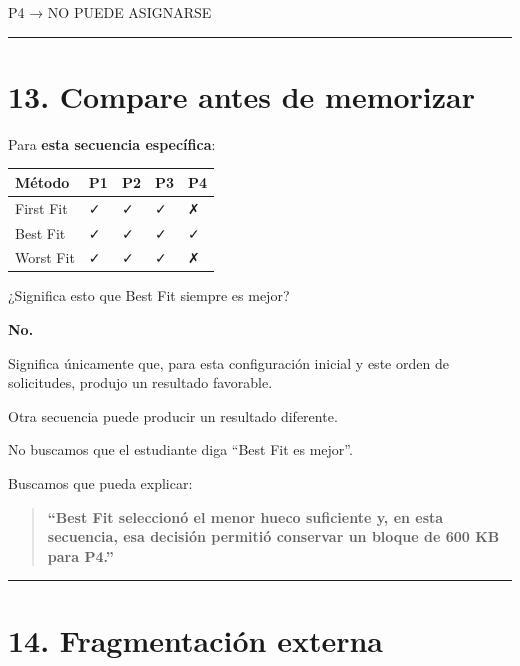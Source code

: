 \documentclass[
  spanish,
  letterpaper,
]{scrbook}
\newenvironment{Shaded}{\begin{snugshade}}{\end{snugshade}}
\newcommand{\NormalTok}[1]{\textcolor[rgb]{0.00,0.23,0.31}{#1}}
\newcounter{none} %
\begin{document}
\begin{Shaded}
\begin{Highlighting}[]
\NormalTok{P4 → NO PUEDE ASIGNARSE}
\end{Highlighting}
\end{Shaded}

\begin{center}\rule{0.5\linewidth}{0.5pt}\end{center}


\chapter{13. Compare antes de
memorizar}\label{compare-antes-de-memorizar-1}

Para \textbf{esta secuencia específica}:

{\def\LTcaptype{none} %
\begin{longtable}[]{@{}lllll@{}}
\toprule\noalign{}
Método & P1 & P2 & P3 & P4 \\
\midrule\noalign{}
\endhead
\bottomrule\noalign{}
\endlastfoot
First Fit & ✓ & ✓ & ✓ & ✗ \\
Best Fit & ✓ & ✓ & ✓ & ✓ \\
Worst Fit & ✓ & ✓ & ✓ & ✗ \\
\end{longtable}
}

¿Significa esto que Best Fit siempre es mejor?

\textbf{No.}

Significa únicamente que, para esta configuración inicial y este orden
de solicitudes, produjo un resultado favorable.

Otra secuencia puede producir un resultado diferente.

No buscamos que el estudiante diga ``Best Fit es mejor''.

Buscamos que pueda explicar:

\begin{quote}
\textbf{``Best Fit seleccionó el menor hueco suficiente y, en esta
secuencia, esa decisión permitió conservar un bloque de 600 KB para
P4.''}
\end{quote}

\begin{center}\rule{0.5\linewidth}{0.5pt}\end{center}


\chapter{14. Fragmentación externa}\label{fragmentaciuxf3n-externa-2}
\end{document}
